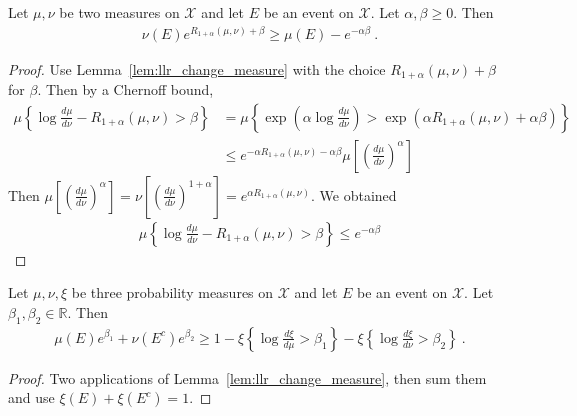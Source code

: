 \begin{lemma}
  \label{lem:renyi_change_measure}
  Let $\mu, \nu$ be two measures on $\mathcal X$ and let $E$ be an event on $\mathcal X$. Let $\alpha,\beta \ge 0$. Then
  \begin{align*}
  \nu(E) e^{R_{1+\alpha}(\mu, \nu) + \beta} \ge \mu(E) - e^{-\alpha \beta} \: .
  \end{align*}
\end{lemma}

\begin{proof}
Use Lemma~\ref{lem:llr_change_measure} with the choice $R_{1+\alpha}(\mu, \nu) + \beta$ for $\beta$. Then by a Chernoff bound,
\begin{align*}
\mu\left\{ \log\frac{d \mu}{d \nu} - R_{1+\alpha}(\mu, \nu) > \beta \right\}
&= \mu\left\{ \exp\left(\alpha\log\frac{d \mu}{d \nu}\right) > \exp\left(\alpha R_{1+\alpha}(\mu, \nu) + \alpha \beta\right) \right\}
\\
&\le e^{-\alpha R_{1+\alpha}(\mu, \nu) - \alpha \beta} \mu\left[\left(\frac{d \mu}{d \nu}\right)^\alpha \right]
\end{align*}
Then $\mu\left[\left(\frac{d \mu}{d \nu}\right)^\alpha \right] = \nu\left[\left(\frac{d \mu}{d \nu}\right)^{1+\alpha} \right] = e^{\alpha R_{1+\alpha}(\mu, \nu)}$. We obtained
\begin{align*}
\mu\left\{ \log\frac{d \mu}{d \nu} - R_{1+\alpha}(\mu, \nu) > \beta \right\}
\le e^{- \alpha \beta}
\end{align*}
\end{proof}

\begin{lemma}
  \label{lem:llr_change_measure_add}
  Let $\mu, \nu, \xi$ be three probability measures on $\mathcal X$ and let $E$ be an event on $\mathcal X$. Let $\beta_1, \beta_2 \in \mathbb{R}$. Then
  \begin{align*}
  \mu(E) e^{\beta_1} + \nu(E^c) e^{\beta_2} \ge 1 - \xi\left\{ \log\frac{d \xi}{d \mu} > \beta_1 \right\} - \xi\left\{ \log\frac{d \xi}{d \nu} > \beta_2 \right\} \: .
  \end{align*}
\end{lemma}

\begin{proof}
Two applications of Lemma~\ref{lem:llr_change_measure}, then sum them and use $\xi(E)+\xi(E^c) = 1$.
\end{proof}

